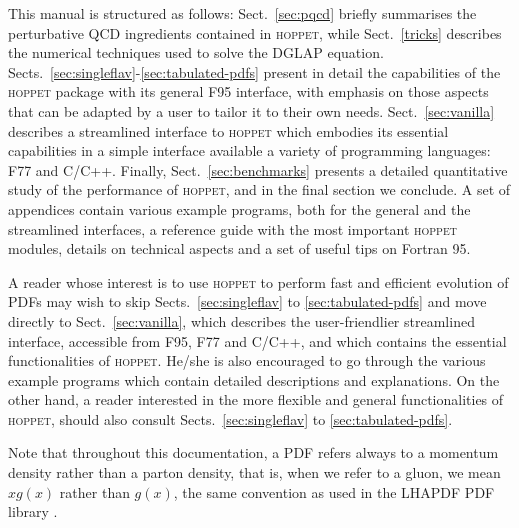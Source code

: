 \documentclass[12pt]{article}
\newcommand{\hoppet}{\textsc{hoppet}\xspace}
\begin{document}
This manual is structured as follows: Sect.~\ref{sec:pqcd}
briefly summarises the perturbative QCD ingredients contained in
\hoppet, while Sect.~\ref{tricks} describes the numerical techniques
used to solve the DGLAP equation. 
Sects.~\ref{sec:singleflav}-\ref{sec:tabulated-pdfs} present in detail the capabilities
of the \hoppet package with its general F95 interface, 
with emphasis on those aspects that
can be adapted by a user to tailor it to their own needs. 
Sect.~\ref{sec:vanilla} describes a streamlined interface
to \hoppet which embodies its essential capabilities in
a simple interface available a variety of programming languages: 
F77 and C/C++.
Finally, Sect.~\ref{sec:benchmarks} presents a detailed 
quantitative study of
the performance of \hoppet, and in the final section we conclude.
A set of appendices contain various example programs,
both for the general and the streamlined interfaces, a reference
guide with the most important \hoppet modules,
details on technical aspects and a set of useful tips on
Fortran 95. 


A reader 
whose interest is to use \hoppet to perform
fast and efficient evolution of PDFs 
may wish to skip 
Sects.~\ref{sec:singleflav} to \ref{sec:tabulated-pdfs}
and move directly to
 Sect.~\ref{sec:vanilla}, which describes the 
user-friendlier streamlined interface,
accessible from F95, F77 and C/C++, and which contains the essential
functionalities of \hoppet. He/she is also encouraged to go through the
various example programs which contain detailed 
descriptions and explanations. 
On the other hand, a reader interested in the
more flexible and general 
functionalities of \hoppet, should also consult
Sects.~\ref{sec:singleflav} to \ref{sec:tabulated-pdfs}. 

Note 
that throughout this documentation, a PDF refers always to a momentum
density rather than a parton density, that is, when we refer to
a gluon, we mean $xg(x)$ rather than $g(x)$, the same convention
as used in the LHAPDF PDF library \cite{LHAPDF}.


\end{document}
